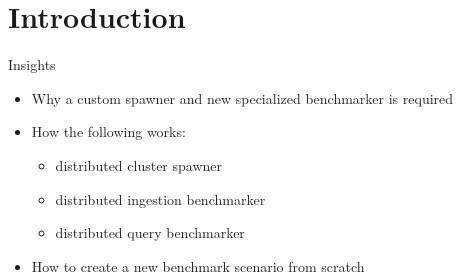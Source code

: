 \documentclass[compress,aspectratio=169]{beamer}
\begin{document}
	\begin{frame}[plain]
		\titlepage
	\end{frame}

	\begin{frame}[t]{}
		\tableofcontents[subsectionstyle=hide/hide]
	\end{frame}


	\section{Introduction}
	\begin{frame}{Insights}
		\begin{itemize}
			\item Why a custom spawner and new specialized benchmarker is required
      \item How the following works:
        \begin{itemize}
          \item distributed cluster spawner
          \item distributed ingestion benchmarker
          \item distributed query benchmarker
        \end{itemize}
      \item How to create a new benchmark scenario from scratch
		\end{itemize}
	\end{frame}
\end{document}
